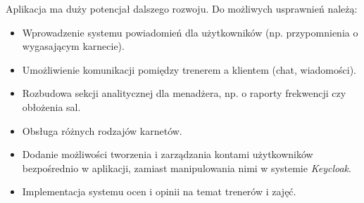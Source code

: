 \documentclass[../../spr.tex]{subfiles}
\begin{document}
Aplikacja ma duży potencjał dalszego rozwoju. Do możliwych usprawnień należą:

\begin{itemize}
  \item Wprowadzenie systemu powiadomień dla użytkowników (np. przypomnienia o wygasającym karnecie).
  \item Umożliwienie komunikacji pomiędzy trenerem a klientem (chat, wiadomości).
  \item Rozbudowa sekcji analitycznej dla menadżera, np. o raporty frekwencji czy obłożenia sal.
  \item Obsługa różnych rodzajów karnetów.
  \item Dodanie możliwości tworzenia i zarządzania kontami użytkowników bezpośrednio w aplikacji, zamiast manipulowania nimi w systemie \textit{Keycloak}.
  \item Implementacja systemu ocen i opinii na temat trenerów i zajęć.
\end{itemize}
\end{document}
